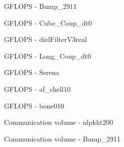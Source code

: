 \begin{figure}[H]
    \centering
    \caption{GFLOPS - Bump\_2911}
    \label{fig:Bump_2911_gflops_single_defq}
\end{figure}

\begin{figure}[H]
    \centering
    \caption{GFLOPS - Cube\_Coup\_dt0}
    \label{fig:Cube_Coup_dt0_gflops_single_defq}
\end{figure}

\begin{figure}[H]
    \centering
    \caption{GFLOPS - dielFilterV3real}
    \label{fig:dielFilterV3real_gflops_single_defq}
\end{figure}

\begin{figure}[H]
    \centering
    \caption{GFLOPS - Long\_Coup\_dt0}
    \label{fig:Long_Coup_dt0_gflops_single_defq}
\end{figure}

\begin{figure}[H]
    \centering
    \caption{GFLOPS - Serena}
    \label{fig:Serena_gflops_single_defq}
\end{figure}

\begin{figure}[H]
    \centering
    \caption{GFLOPS - af\_shell10}
    \label{fig:af_shell10_gflops_single_defq}
\end{figure}

\begin{figure}[H]
    \centering
    \caption{GFLOPS - bone010}
    \label{fig:bone010_gflops_single_defq}
\end{figure}

\begin{figure}[H]
    \centering
    \caption{Communication volume - nlpkkt200}
    \label{fig:nlpkkt200_commload_single_defq}
\end{figure}

\begin{figure}[H]
    \centering
    \caption{Communication volume - Bump\_2911}
    \label{fig:Bump_2911_commload_single_defq}
\end{figure}

